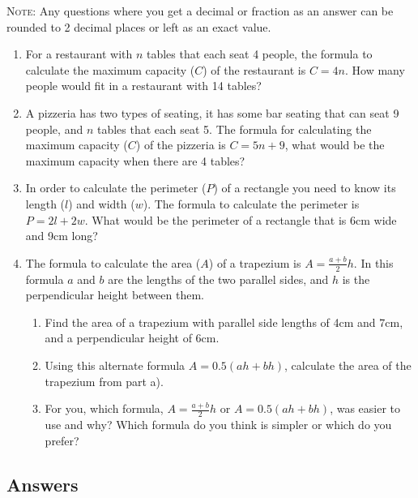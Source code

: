 \documentclass[a4paper,12pt]{article}
\begin{document}
\textsc{Note}: Any questions where you get a decimal or fraction 
as an answer can be rounded to 2 decimal places or left as 
an exact value.

\begin{enumerate}
\item For a restaurant with $n$ tables that each seat 4 people,
    the formula to calculate the maximum capacity ($C$) of the 
    restaurant is $C = 4n$. How many people would fit in a
    restaurant with 14 tables?

\item A pizzeria has two types of seating, it has some bar 
    seating that can seat 9 people, and $n$ tables that 
    each seat 5. The formula for calculating the maximum 
    capacity ($C$) of the pizzeria is $C = 5n + 9$, what
    would be the maximum capacity when there are 4 tables?

\item In order to calculate the perimeter ($P$) of a rectangle 
    you need to know its length ($l$) and width ($w$). The formula
    to calculate the perimeter is $P = 2l + 2w$. What would be
    the perimeter of a rectangle that is 6cm wide and 9cm long?

\item The formula to calculate the area ($A$) of a trapezium is
    $A = \frac{a + b}{2}h$. In this formula $a$ and 
    $b$ are the lengths of the two parallel sides, and $h$ is the 
    perpendicular height between them.
    \begin{enumerate}
    \item Find the area of a trapezium with parallel side lengths 
        of 4cm and 7cm, and a perpendicular height of 6cm.
    \item Using this alternate formula 
        $A = 0.5(ah + bh)$, calculate the 
        area of the trapezium from part a).
    \item For you, which formula, $A = \frac{a + b}{2}h$
        or $A = 0.5(ah + bh)$, was easier to use and why? Which 
        formula do you think is simpler or which do you prefer?
    \end{enumerate}

\end{enumerate}

\newpage
\subsection*{Answers}
\end{document}
